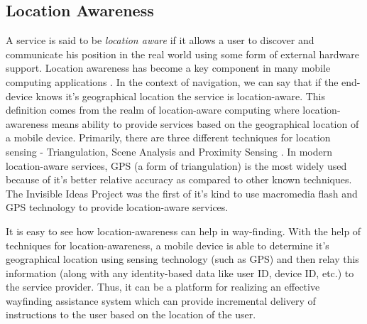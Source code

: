 \documentclass{iitkthesis}
\begin{document}
\subsection{Location Awareness}
A service is said to be \textit{location aware} if it allows a user to 
discover and communicate his position in the real world using some  
form of external hardware support. Location awareness has become 
a key component in many mobile computing applications \cite{parctab}. 
In the context of navigation, we can say that if the end-device knows it's 
geographical location the service is location-aware. This definition 
comes from the realm of location-aware computing where location-awareness 
means ability to provide services based on the geographical location of a 
mobile device. Primarily, there are three different techniques for 
location sensing - Triangulation, Scene Analysis and Proximity Sensing 
\cite{hightower}. In modern location-aware services, GPS (a form of triangulation) is the 
most widely used because of it's better relative accuracy as compared to other known techniques. 
The Invisible Ideas Project \cite{perry} was the first of it's kind to use macromedia flash and GPS 
technology to provide location-aware services.

It is easy to see how location-awareness can help in way-finding. 
With the help of techniques for location-awareness, a mobile device is
able to determine it's geographical location using sensing technology (such as GPS) 
and then relay this information (along with any identity-based data like 
user ID, device ID, etc.) to the service provider. Thus, it can be a platform 
for realizing an effective wayfinding assistance system which can provide 
incremental delivery of instructions to the user based on the location of 
the user. 
\end{document}
